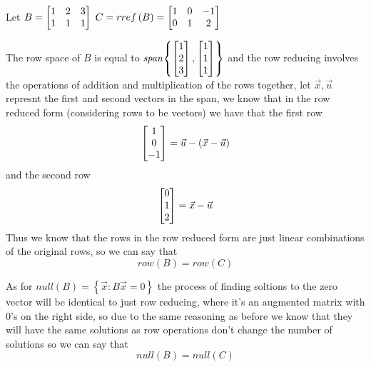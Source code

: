\documentclass[11pt]{book}
\begin{document}
Let $B = \begin{bmatrix} 1 & 2 & 3 \\ 1 & 1 & 1 \end{bmatrix}$ $C = rref\left(B\right) = \begin{bmatrix} 1 & 0 & -1 \\ 0 & 1 & 2 \end{bmatrix}$ 

\begin{eg}
    The row space of $B$ is equal to  $\mathit{span} {\left\{ \begin{bmatrix} 1 \\ 2 \\ 3 \end{bmatrix}, \begin{bmatrix} 1 \\ 1 \\ 1 \end{bmatrix} \right\}} $ and the row reducing involves the operations of addition and multiplication of the rows together, let $\vec{x}, \vec{u}$ represnt the first and second vectors in the span, we know that in the row reduced form (considering rows to be vectors) we have that the first row
    \begin{equation*}
        \begin{bmatrix} 1 \\ 0 \\ -1 \end{bmatrix} = \vec{u} - \left( \vec{x} - \vec{u} \right)
    \end{equation*}
    and the second row
    \begin{equation*}
        \begin{bmatrix} 0 \\ 1 \\ 2 \end{bmatrix} = \vec{x} - \vec{u}
    \end{equation*}
    Thus we know that the rows in the row reduced form are just linear combinations of the original rows, so we can say that
    \begin{equation*}
        row\left(B\right) = row\left(C\right)
    \end{equation*}
\end{eg}

\begin{eg}
    As for $\mathit{null} {\left( B \right)} = \left\{ \vec{x}: B \vec{x} = 0 \right\} $ the process of finding soltions to the zero vector will be identical to just row reducing, where it's an augmented matrix with 0's on the right side, so due to the same reasoning as before we know that they will have the same solutions as row operations don't change the number of solutions so we can say that 
    \begin{equation*}
        \mathit{null} {\left( B \right)}  = \mathit{null} {\left( C \right)} 
    \end{equation*}
\end{eg}
\end{document}
